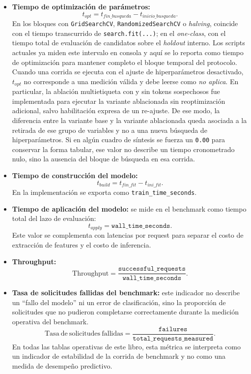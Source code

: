 \documentclass[12pt,oneside]{report}
\begin{document}
\begin{itemize}[leftmargin=*]
  \item \textbf{Tiempo de optimización de parámetros:}
  \[
  t_{opt}=t_{fin\_busqueda}-t_{inicio\_busqueda}.
  \]
  En los bloques con \texttt{GridSearchCV}, \texttt{RandomizedSearchCV} o \textit{halving}, coincide con el tiempo transcurrido de \texttt{search.fit(...)}; en el \textit{one-class}, con el tiempo total de evaluación de candidatos sobre el \textit{holdout} interno. Los scripts actuales ya miden este intervalo en consola y aquí se lo reporta como tiempo de optimización para mantener completo el bloque temporal del protocolo. Cuando una corrida se ejecuta con el ajuste de hiperparámetros desactivado, $t_{opt}$ no corresponde a una medición válida y debe leerse como \textit{no aplica}. En particular, la ablación multietiqueta con y sin tokens sospechosos fue implementada para ejecutar la variante ablacionada sin reoptimización adicional, salvo habilitación expresa de un re-ajuste. De ese modo, la diferencia entre la variante base y la variante ablacionada queda asociada a la retirada de ese grupo de variables y no a una nueva búsqueda de hiperparámetros. Si en algún cuadro de síntesis se fuerza un \texttt{0.00} para conservar la forma tabular, ese valor no describe un tiempo cronometrado nulo, sino la ausencia del bloque de búsqueda en esa corrida.

  \item \textbf{Tiempo de construcción del modelo:}
  \[
  t_{build}=t_{fin\_fit}-t_{ini\_fit}.
  \]
  En la implementación se exporta como \texttt{train\_time\_seconds}.

  \item \textbf{Tiempo de aplicación del modelo:}
  se mide en el benchmark como tiempo total del lazo de evaluación:
  \[
  t_{apply}=\texttt{wall\_time\_seconds}.
  \]
  Este valor se complementa con latencias por request para separar el costo de extracción de features y el costo de inferencia.

  \item \textbf{Throughput:}
  \[
  \mathrm{Throughput}=\frac{\texttt{successful\_requests}}{\texttt{wall\_time\_seconds}}.
  \]

  \item \textbf{Tasa de solicitudes fallidas del benchmark:}
  este indicador no describe un ``fallo del modelo'' ni un error de clasificación, sino la proporción de solicitudes que no pudieron completarse correctamente durante la medición operativa del benchmark.
  \[
  \mathrm{Tasa\ de\ solicitudes\ fallidas}=\frac{\texttt{failures}}{\texttt{total\_requests\_measured}}.
  \]
  En todas las tablas operativas de este libro, esta métrica se interpreta como un indicador de estabilidad de la corrida de benchmark y no como una medida de desempeño predictivo.


\end{itemize}
\end{document}
